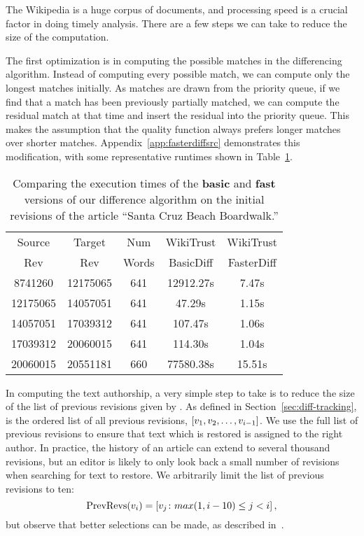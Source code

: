 The Wikipedia is a huge corpus of documents, and processing speed
is a crucial factor in doing timely analysis.
There are a few steps we can take to reduce the size of the computation.

The first optimization is in computing the possible
matches in the differencing algorithm.
Instead of computing every possible match, we can compute
only the longest matches initially.
As matches are drawn from the priority queue, if we find
that a match has been previously partially matched, we can
compute the residual match at that time and insert the residual
into the priority queue.
This makes the assumption that the quality function always
prefers longer matches over shorter matches.
Appendix~\ref{app:fasterdiffsrc} demonstrates this
modification, with some representative runtimes shown
in Table~\ref{tab:comparediff}.


\begin{table}
\begin{center}
\begin{tabular}{| c | c || c || c | c |}
\hline
Source & Target & Num & WikiTrust & WikiTrust \\
Rev & Rev & Words & BasicDiff & FasterDiff \\
\hline
8741260 & 12175065 & 641 & 12912.27s & 7.47s \\
12175065 & 14057051 & 641 & 47.29s & 1.15s \\
14057051 & 17039312 & 641 & 107.47s & 1.06s \\
17039312 & 20060015 & 641 & 114.30s & 1.04s \\
20060015 & 20551181 & 660 & 77580.38s & 15.51s \\
\hline
\end{tabular}
\end{center}
\caption{Comparing the execution times of the \textbf{basic}
    and \textbf{fast} versions of our difference algorithm
    on the initial revisions of the article ``Santa Cruz Beach Boardwalk.''}
\label{tab:comparediff}
\end{table}



In computing the text authorship,
a very simple step to take is to reduce the size of the list of
previous revisions given by .
As defined in Section~\ref{sec:diff-tracking},  
is the ordered list of all previous revisions,
$\left[ v_{1}, v_{2}, \ldots, v_{i-1} \right]$.
We use the full list of previous revisions to ensure that text which
is restored is assigned to the right author.
In practice, the history of an article can extend to several thousand
revisions, but an editor is likely to only look back a small number
of revisions when searching for text to restore.
We arbitrarily limit the list of previous revisions to ten:
\begin{equation*}
    \mathrm{PrevRevs}(v_{i}) = \left[ v_{j} \colon
	max(1,i-10) \le j < i \right],
\end{equation*}
but observe that better selections can be made, as described
in~\cite{Chatterjee2008}.

